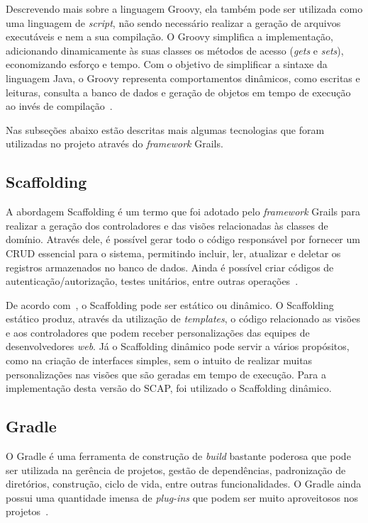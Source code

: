 Descrevendo mais sobre a linguagem Groovy, ela também pode ser utilizada como uma linguagem de \textit{script}, não sendo necessário realizar a geração de arquivos executáveis e nem a sua compilação. O Groovy simplifica a implementação, adicionando dinamicamente às suas classes os métodos de acesso (\textit{gets} e \textit{sets}), economizando esforço e tempo. Com o objetivo de simplificar a sintaxe da linguagem Java, o Groovy representa comportamentos dinâmicos, como escritas e leituras, consulta a banco de dados e geração de objetos em tempo de execução ao invés de compilação~\cite{konig-et-al:gia07}.

Nas subseções abaixo estão descritas mais algumas tecnologias que foram utilizadas no projeto através do \textit{framework} Grails.

\subsection{Scaffolding}
\label{sec-projeto-scaffolding}

A abordagem Scaffolding é um termo que foi adotado pelo \textit{framework} Grails para realizar a geração dos controladores e das visões relacionadas às classes de domínio. Através dele, é possível gerar todo o código responsável por fornecer um CRUD essencial para o sistema, permitindo incluir, ler, atualizar e deletar os registros armazenados no banco de dados. Ainda é possível criar códigos de autenticação/autorização, testes unitários, entre outras operações~\cite{beder:ew12}.

De acordo com~, o Scaffolding pode ser estático ou dinâmico. O Scaffolding estático produz, através da utilização de \textit{templates}, o código relacionado as visões e aos controladores que podem receber personalizações das equipes de desenvolvedores \textit{web}. Já o Scaffolding dinâmico pode servir a vários propósitos, como na criação de interfaces simples, sem o intuito de realizar muitas personalizações nas visões que são geradas em tempo de execução. Para a implementação desta versão do SCAP, foi utilizado o Scaffolding dinâmico.   

\subsection{Gradle}
\label{sec-projeto-gradle}

O Gradle é uma ferramenta de construção de \textit{build} bastante poderosa que pode ser utilizada na gerência de projetos, gestão de dependências, padronização de diretórios, construção, ciclo de vida, entre outras funcionalidades. O Gradle ainda possui uma quantidade imensa de \textit{plug-ins} que podem ser muito aproveitosos nos projetos~\cite{weissmann:fgapdw15}.

